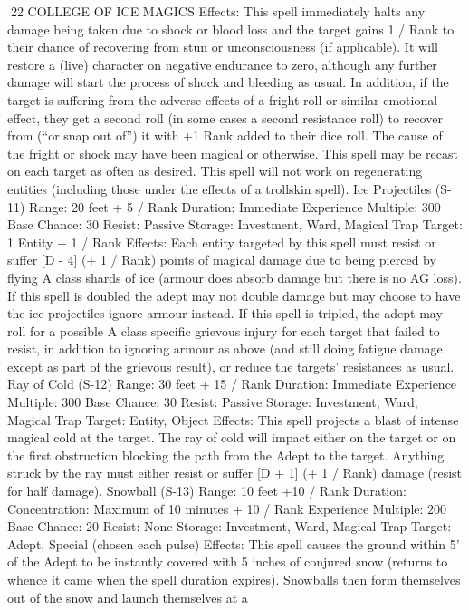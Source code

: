 \documentclass[a4paper]{article}
\begin{document}
\begin{multicols}{3}
22 COLLEGE OF ICE MAGICS
Effects: This spell immediately halts any damage
being taken due to shock or blood loss and the
target gains 1 / Rank to their chance of recovering
from stun or unconsciousness (if applicable). It will
restore a (live) character on negative endurance to
zero, although any further damage will start the
process of shock and bleeding as usual. In addition,
if the target is suffering from the adverse effects of
a fright roll or similar emotional effect, they get a
second roll (in some cases a second resistance roll)
to recover from (“or snap out of”) it with +1%
Rank added to their dice roll. The cause of the
fright or shock may have been magical or otherwise. This spell may be recast on each target as
often as desired. This spell will not work on regenerating entities (including those under the effects of
a trollskin spell).
Ice Projectiles (S-11)
Range: 20 feet + 5 / Rank
Duration: Immediate
Experience Multiple: 300
Base Chance: 30%
Resist: Passive
Storage: Investment, Ward, Magical Trap
Target: 1 Entity + 1 / Rank
Effects: Each entity targeted by this spell must
resist or suffer [D - 4] (+ 1 / Rank) points of magical damage due to being pierced by flying A class
shards of ice (armour does absorb damage but there
is no AG loss). If this spell is doubled the adept
may not double damage but may choose to have
the ice projectiles ignore armour instead. If this
spell is tripled, the adept may roll for a possible A
class specific grievous injury for each target that
failed to resist, in addition to ignoring armour as
above (and still doing fatigue damage except as
part of the grievous result), or reduce the targets’
resistances as usual.
Ray of Cold (S-12)
Range: 30 feet + 15 / Rank
Duration: Immediate
Experience Multiple: 300
Base Chance: 30%
Resist: Passive
Storage: Investment, Ward, Magical Trap
Target: Entity, Object
Effects: This spell projects a blast of intense magical cold at the target. The ray of cold will impact
either on the target or on the first obstruction
blocking the path from the Adept to the target.
Anything struck by the ray must either resist or
suffer [D + 1] (+ 1 / Rank) damage (resist for half
damage).
Snowball (S-13)
Range: 10 feet +10 / Rank
Duration: Concentration: Maximum of 10 minutes
+ 10 / Rank
Experience Multiple: 200
Base Chance: 20%
Resist: None
Storage: Investment, Ward, Magical Trap
Target: Adept, Special (chosen each pulse)
Effects: This spell causes the ground within 5’ of
the Adept to be instantly covered with 5 inches of
conjured snow (returns to whence it came when the
spell duration expires). Snowballs then form themselves out of the snow and launch themselves at a

\end{multicols}
\end{document}
